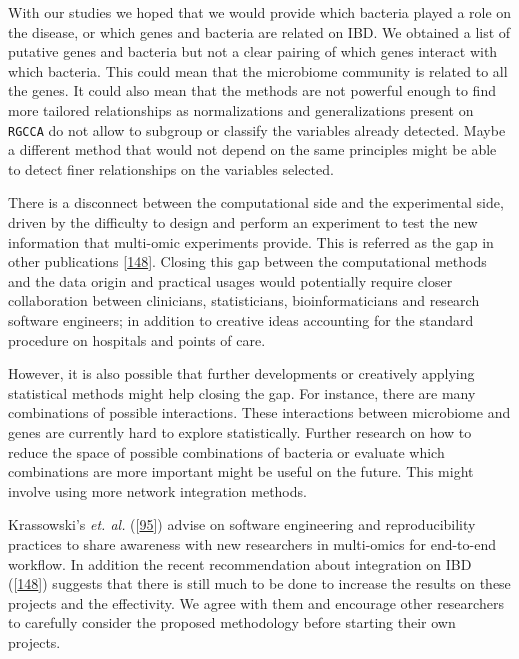\documentclass[
  12pt,
  a4paper,
  twoside,
  openright]{book}
\begin{document}
With our studies we hoped that we would provide which bacteria played a role on the disease, or which genes and bacteria are related on IBD.
We obtained a list of putative genes and bacteria but not a clear pairing of which genes interact with which bacteria.
This could mean that the microbiome community is related to all the genes.
It could also mean that the methods are not powerful enough to find more tailored relationships as normalizations and generalizations present on \texttt{RGCCA} do not allow to subgroup or classify the variables already detected.
Maybe a different method that would not depend on the same principles might be able to detect finer relationships on the variables selected.

There is a disconnect between the computational side and the experimental side, driven by the difficulty to design and perform an experiment to test the new information that multi-omic experiments provide.
This is referred as the gap in other publications {[}\protect\hyperlink{ref-sudhakar2022}{148}{]}.
Closing this gap between the computational methods and the data origin and practical usages would potentially require closer collaboration between clinicians, statisticians, bioinformaticians and research software engineers; in addition to creative ideas accounting for the standard procedure on hospitals and points of care.

However, it is also possible that further developments or creatively applying statistical methods might help closing the gap.
For instance, there are many combinations of possible interactions.
These interactions between microbiome and genes are currently hard to explore statistically.
Further research on how to reduce the space of possible combinations of bacteria or evaluate which combinations are more important might be useful on the future.
This might involve using more network integration methods.

Krassowski's \emph{et. al.} ({[}\protect\hyperlink{ref-krassowski2020}{95}{]}) advise on software engineering and reproducibility practices to share awareness with new researchers in multi-omics for end-to-end workflow.
In addition the recent recommendation about integration on IBD ({[}\protect\hyperlink{ref-sudhakar2022}{148}{]}) suggests that there is still much to be done to increase the results on these projects and the effectivity.
We agree with them and encourage other researchers to carefully consider the proposed methodology before starting their own projects.
\end{document}
